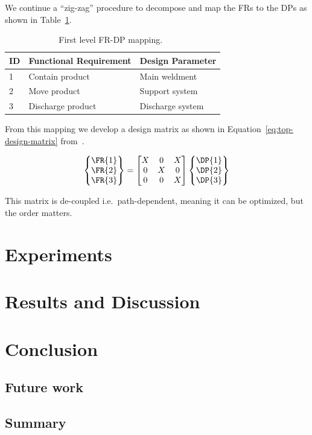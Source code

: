\documentclass[twocolumn]{webofc}
\begin{document}
We continue a ``zig-zag'' procedure to decompose and map the FRs to the DPs as shown in Table~\ref{tab:first_level-frdp}.

\begin{table}
  \center
  \caption{First level FR-DP mapping.~\cite{gerhard2016suretrack}}\label{tab:first_level-frdp}
  \begin{tabular}{lll} \toprule
    ID& Functional Requirement & Design Parameter \\ \midrule 
    1&Contain product&Main weldment\\
    2&Move product&Support system\\
    3&Discharge product &Discharge system\\
    \bottomrule
  \end{tabular}
\end{table}

From this mapping we develop a design matrix as shown in Equation~\ref{eq:top-design-matrix} from~\cite{gerhard2016suretrack}.

\begin{equation}\label{eq:top-design-matrix}
\begin{Bmatrix}
\FR{1}\\
\FR{2}\\
\FR{3}
\end{Bmatrix}=
\begin{bmatrix}
X &  0 & X\\
0 &  X & 0\\
0 &  0 & X
\end{bmatrix}
\begin{Bmatrix}
\DP{1}\\
\DP{2}\\
\DP{3}
\end{Bmatrix}
\end{equation}

This matrix is de-coupled i.e.\ path-dependent, meaning it can be optimized, but the order matters.

\section{Experiments}

\section{Results and Discussion}

\section{Conclusion}

\subsection{Future work}

\subsection{Summary}

%

\end{document}
